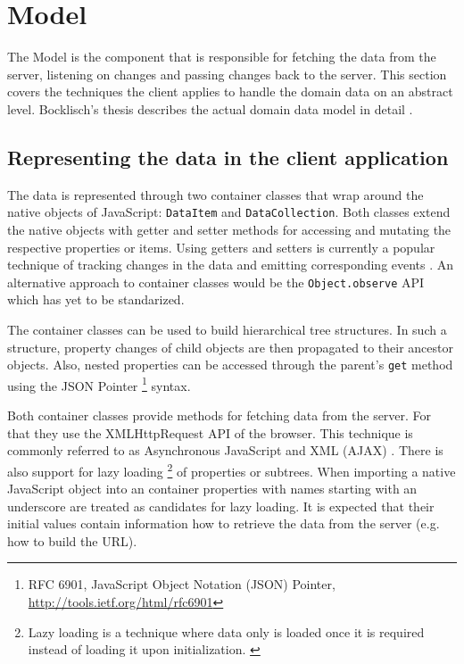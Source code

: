 \section{Model}

The Model is the component that is responsible for fetching the data from the server, listening on changes and passing changes back to the server. This section covers the techniques the client applies to handle the domain data on an abstract level. Bocklisch's thesis describes the actual domain data model in detail \cite{Bocklisch_2013}.

\subsection{Representing the data in the client application}

The data is represented through two container classes that wrap around the native objects of JavaScript: \texttt{DataItem} and \texttt{DataCollection}. Both classes extend the native objects with getter and setter methods for accessing and mutating the respective properties or items. Using getters and setters is currently a popular technique of tracking changes in the data and emitting corresponding events . An alternative approach to container classes would be the \texttt{Object.observe} API \cite{Waldron_2012} which has yet to be standarized.

The container classes can be used to build hierarchical tree structures. In such a structure, property changes of child objects are then propagated to their ancestor objects. Also, nested properties can be accessed through the parent's \texttt{get} method using the JSON Pointer \footnote{RFC 6901, JavaScript Object Notation (JSON) Pointer, \url{http://tools.ietf.org/html/rfc6901}} syntax.

Both container classes provide methods for fetching data from the server. For that they use the XMLHttpRequest \cite{W3C_XHR} API of the browser. This technique is commonly referred to as Asynchronous JavaScript and XML (AJAX) \cite{Garrett_2005}. There is also support for lazy loading \footnote{Lazy loading is a technique where data only is loaded once it is required instead of loading it upon initialization. \cite{Fowler_2002}} of properties or subtrees. When importing a native JavaScript object into an container properties with names starting with an underscore are treated as candidates for lazy loading. It is expected that their initial values contain information how to retrieve the data from the server (e.g. how to build the URL).


